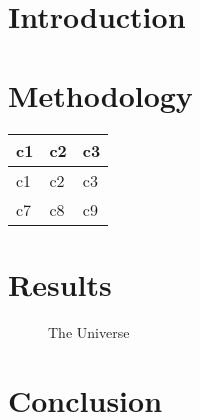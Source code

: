 \documentclass{article}
\title{}
\author{Sui Jiet Tay}
\date{}
\begin{document}
\maketitle

\begin{abstract}
\end{abstract}

\begin{multicols}{2}
\section{Introduction}

\section{Methodology}

\begin{tabular}{ | m{5em} | m{1cm}| m{1cm} | } 
\hline
c1 & c2 & c3 \\ 
\hline
c1 & c2 & c3 \\ 
\hline
c7 & c8 & c9 \\ 
\hline
\end{tabular}


\section{Results}

\begin{figure}[h!]
\centering
\caption{The Universe}
\label{fig:universe}
\end{figure}

\section{Conclusion}



\end{multicols}
\end{document}
